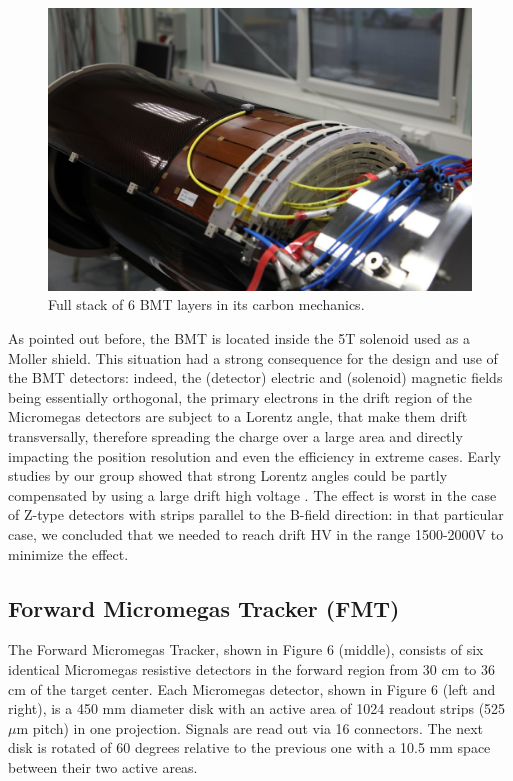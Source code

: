 \begin{figure}[htb]
 \includegraphics[width=1.0\columnwidth,keepaspectratio]{images/fig5}
 \caption{Full stack of 6 BMT layers in its carbon mechanics.}
 \label{fig:mm-fig5}
\end{figure}

As pointed out before, the BMT is located inside the 5T solenoid used as a Moller shield. This situation had a strong consequence for the design and use of the BMT detectors: indeed, the (detector) electric and (solenoid) magnetic fields being essentially orthogonal, the primary electrons in the drift region of the Micromegas detectors are subject to a Lorentz angle, that make them drift transversally, therefore spreading the charge over a large area and directly impacting the position resolution and even the efficiency in extreme cases. Early studies by our group showed that strong Lorentz angles could be partly compensated by using a large drift high voltage \cite{KONCZYKOWSKI2010274}. The effect is worst in the case of Z-type detectors with strips parallel to the B-field direction: in that particular case, we concluded that we needed to reach drift HV in the range 1500-2000V to minimize the effect.

\subsection{Forward Micromegas Tracker (FMT)}

The Forward Micromegas Tracker, shown in Figure 6 (middle), consists of six identical Micromegas resistive detectors in the forward region from 30 cm to 36 cm of the target center. Each Micromegas detector, shown in Figure 6 (left and right), is a 450 mm diameter disk with an active area of 1024 readout strips (525 $\mu$m pitch) in one projection. Signals are read out via 16 connectors. The next disk is rotated of 60 degrees relative to the previous one with a 10.5 mm space between their two active areas. 

